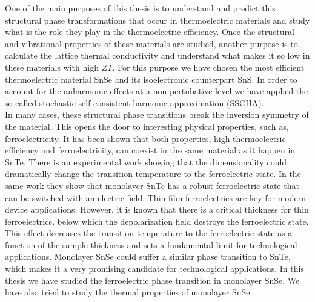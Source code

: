 One of the main purposes of this thesis is to understand and predict this structural phase transformations that occur 
in thermoelectric materials and study what is the role they play in the thermoelectric efficiency. Once the 
structural and vibrational properties of these materials are studied, another purpose is to calculate the lattice 
thermal conductivity and understand what makes it so low in these materials with high $ZT$. For this purpose we have 
chosen the most efficient thermoelectric material SnSe and its isoelectronic counterpart SnS. In order to account 
for the anharmonic effects at a non-pertubative level we have applied the so called stochastic self-consistent 
harmonic approximation\cite{errea2013first,errea2014anharmonic,bianco2017second,monacelli2018pressure} (SSCHA). \\

In many cases, these structural phase transitions break the inversion symmetry of the 
material\cite{ribeiro2018strong,chang2016discovery}. This opens the door to interesting physical properties, such 
as, ferroelectricity. It has been shown that both properties, high thermoelectric efficiency and ferroelectricity, 
can coexist in the same material as it happen in SnTe\cite{ribeiro2018strong,zhang2013high}. There is an 
experimental work\cite{chang2016discovery} showing that the dimensionality could dramatically change the transition 
temperature to the ferroelectric state. In the same work\cite{chang2016discovery} they show that 
monolayer SnTe has a robust ferroelectric state that can be switched with an electric field. Thin film ferroelectrics 
are key for modern device applications\cite{lallart2011ferroelectrics}. However, it is known that there is a critical 
thickness for thin ferroelectrics, below which the depolarization field destroys the ferroelectric 
state\cite{batra1973new,zhong1994giant,dawber2005physics}. This effect decreases the transition temperature to the 
ferroelectric state as a function of the sample thickness\cite{fong2004ferroelectricity,fong2006stabilization} and 
sets a fundamental limit for technological applications. Monolayer SnSe could suffer a similar phase transition to 
SnTe, which makes it a very promising candidate for technological applications. In this thesis we have studied 
the ferroelectric phase transition in monolayer SnSe\cite{chang2020controlled}. We have also tried to study the 
thermal properties of monolayer SnSe. \\

